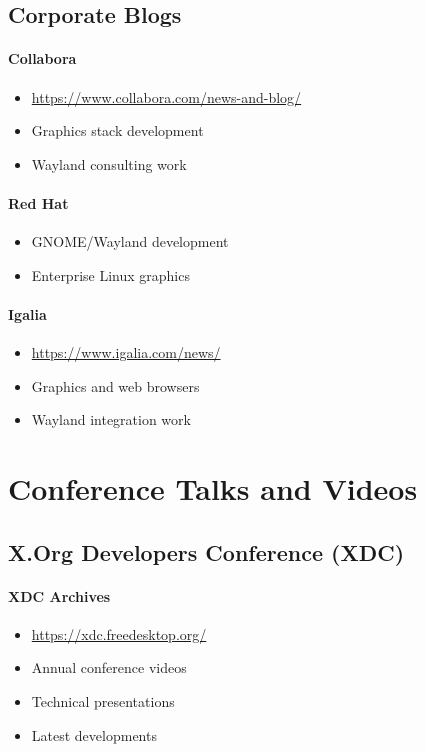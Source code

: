 \subsection{Corporate Blogs}

\paragraph{Collabora}
\begin{itemize}
    \item \url{https://www.collabora.com/news-and-blog/}
    \item Graphics stack development
    \item Wayland consulting work
\end{itemize}

\paragraph{Red Hat}
\begin{itemize}
    \item GNOME/Wayland development
    \item Enterprise Linux graphics
\end{itemize}

\paragraph{Igalia}
\begin{itemize}
    \item \url{https://www.igalia.com/news/}
    \item Graphics and web browsers
    \item Wayland integration work
\end{itemize}

\section{Conference Talks and Videos}

\subsection{X.Org Developers Conference (XDC)}

\paragraph{XDC Archives}
\begin{itemize}
    \item \url{https://xdc.freedesktop.org/}
    \item Annual conference videos
    \item Technical presentations
    \item Latest developments
\end{itemize}

